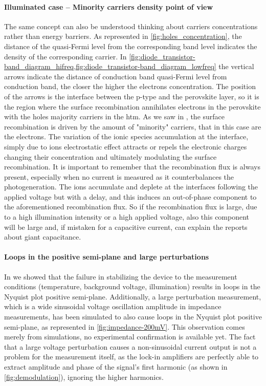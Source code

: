 	\paragraph{Illuminated case -- Minority carriers density point of view}
The same concept can also be understood thinking about carriers concentrations rather than energy barriers.
As represented in \cref{fig:holes_concentration}, the distance of the quasi\hyp{}Fermi level from the corresponding band level indicates the density of the corresponding carrier.
In \cref{fig:diode_transistor-band_diagram_hifreq,fig:diode_transistor-band_diagram_lowfreq} the vertical arrows indicate the distance of conduction band quasi\hyp{}Fermi level from conduction band, the closer the higher the electrons concentration.
The position of the arrows is the interface between the p-type and the perovskite layer, so it is the region where the surface recombination annihilates electrons in the perovskite with the holes majority carriers in the \gls{htm}.
As we saw in , the surface recombination is driven by the amount of "minority" carriers, that in this case are the electrons.
The variation of the ionic species accumulation at the interface, simply due to ions electrostatic effect attracts or repels the electronic charges changing their concentration and ultimately modulating the surface recombination.
It is important to remember that the recombination flux is always present, especially when no current is measured as it counterbalances the photogeneration.
The ions accumulate and deplete at the interfaces following the applied voltage but with a delay, and this induces an out\hyp{}of\hyp{}phase component to the aforementioned recombination flux.
So if the recombination flux is large, due to a high illumination intensity or a high applied voltage, also this component will be large and, if mistaken for a capacitive current, can explain the reports about giant capacitance.
	



	\paragraph{Loops in the positive semi-plane and large perturbations}\label{impedance-large_perturbations}
		In  we showed that the failure in stabilizing the device to the measurement conditions (temperature, background voltage, illumination) results in loops in the Nyquist plot positive semi\hyp{}plane.
		Additionally, a large perturbation measurement, which is a wide sinusoidal voltage oscillation amplitude in impedance measurements, has been simulated to also cause loops in the Nyquist plot positive semi\hyp{}plane, as represented in \cref{fig:impedance-200mV}.
		This observation comes merely from simulations, no experimental confirmation is available yet.
The fact that a large voltage perturbation causes a non\hyp{}sinusoidal current output is not a problem for the measurement itself, as the lock-in amplifiers are perfectly able to extract amplitude and phase of the signal's first harmonic (as shown in \cref{fig:demodulation}), ignoring the higher harmonics.

